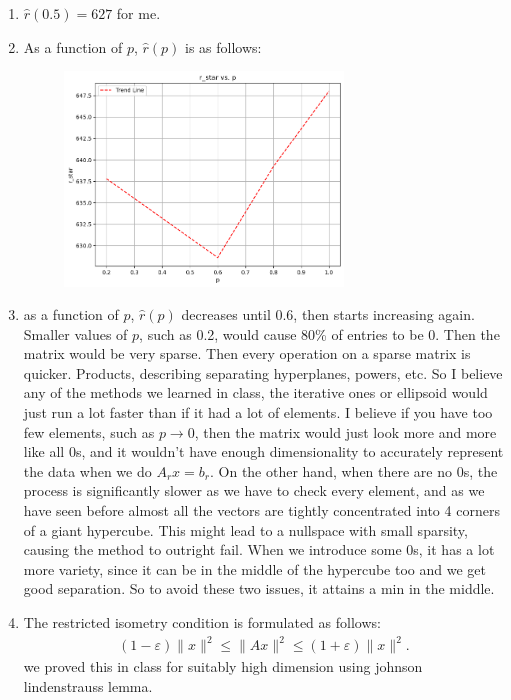 \documentclass[12pt]{article}
\def \ve{\varepsilon}
\newcommand{\mg}[1]{\| #1 \|}
\begin{document}
\begin{enumerate}[label=(\alph*)]
        \item $\hat r(0.5) = 627$ for me. 
        \item As a function of $p$, $\hat r(p)$ is as follows:
        \begin{figure}[H]
            \centering
            \includegraphics[width=0.7\textwidth]{r_hat.png}
        \end{figure}

        \item as a function of $p$, $\hat r(p)$ decreases until $0.6$, then starts increasing again. Smaller values of $p$, such as 0.2, would cause 80\% of entries to be 0. Then the matrix would be very sparse. Then every operation on a sparse matrix is quicker. Products, describing separating hyperplanes, powers, etc. So I believe any of the methods we learned in class, the iterative ones or ellipsoid would just run a lot faster than if it had a lot of elements. I believe if you have too few elements, such as $p \to 0$, then the matrix would just look more and more like all 0s, and it wouldn't have enough dimensionality to accurately represent the data when we do $A_rx = b_r$. On the other hand, when there are no 0s, the process is significantly slower as we have to check every element, and as we have seen before almost all the vectors are tightly concentrated into 4 corners of a giant hypercube. This might lead to a nullspace with small sparsity, causing the method to outright fail. When we introduce some 0s, it has a lot more variety, since it can be in the middle of the hypercube too and we get good separation. So to avoid these two issues, it attains a min in the middle. 

        \item The restricted isometry condition is formulated as follows: 
        \begin{align*}
            (1-\ve)\mg{x}^2 \leq \mg{Ax}^2 \leq (1+\ve)\mg{x}^2.
        \end{align*}
        we proved this in class for suitably high dimension using johnson lindenstrauss lemma.
        

\end{enumerate}
\end{document}
